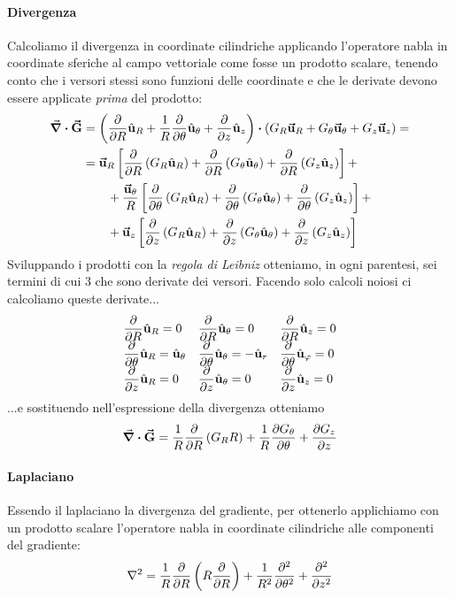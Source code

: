 \paragraph{Divergenza}
Calcoliamo il divergenza in coordinate cilindriche applicando l'operatore nabla in coordinate sferiche al campo vettoriale come fosse un prodotto scalare, tenendo conto che i versori stessi sono funzioni delle coordinate e che le derivate devono essere applicate \textit{prima} del prodotto:
\begin{align*}
	\div{\vba{G}}&=\left(\pdv{R}\vbh{u}_R+\frac{1}{R}\pdv{\theta}\vbh{u}_\theta+\pdv{z}\vbh{u}_z\right)\vdot\left(G_R\vba{u}_R+G_\theta\vba{u}_\theta+G_z\vba{u}_z\right)=\\
	&=\vba{u}_R\left[\pdv{R}\left(G_R\vbh{u}_R\right)+\pdv{R}\left(G_\theta\vbh{u}_\theta\right)+\pdv{R}\left(G_z\vbh{u}_{z}\right)\right]+\\
	&\qquad+\frac{\vba{u}_\theta}{R}\left[\pdv{\theta}\left(G_R\vbh{u}_R\right)+\pdv{\theta}\left(G_\theta\vbh{u}_\theta\right)+\pdv{\theta}\left(G_z\vbh{u}_{z}\right)\right]+\\
	&\qquad+\vba{u}_z\left[\pdv{z}\left(G_R\vbh{u}_R\right)+\pdv{z}\left(G_\theta\vbh{u}_\theta\right)+\pdv{z}\left(G_z\vbh{u}_{z}\right)\right]
\end{align*}
Sviluppando i prodotti con la \textit{regola di Leibniz} otteniamo, in ogni parentesi, sei termini di cui 3 che sono derivate dei versori. Facendo solo calcoli noiosi ci calcoliamo queste derivate...
\begin{equation*}
	\begin{array}{*3{>{\displaystyle}l}}
	\pdv{R}\vbh{u}_R=0&
	\pdv{R}\vbh{u}_\theta=0&
	\pdv{R}\vbh{u}_z=0\\
	\pdv{\theta}\vbh{u}_R=\vbh{u}_\theta&
	\pdv{\theta}\vbh{u}_\theta=-\vbh{u}_r&
	\pdv{\theta}\vbh{u}_\phi=0\\
	\pdv{z}\vbh{u}_R=0&
	\pdv{z}\vbh{u}_\theta=0&
	\pdv{z}\vbh{u}_z=0
	\end{array}
\end{equation*}
...e sostituendo nell'espressione della divergenza otteniamo
\begin{equation}
	\div{\vb*{\va{G}}}=\frac{1}{R}\pdv{R}\left(G_R R\right)+\frac{1}{R}\pdv{G_\theta}{\theta}+\pdv{G_z}{z}
\end{equation}
\paragraph{Laplaciano}
Essendo il laplaciano la divergenza del gradiente, per ottenerlo applichiamo con un prodotto scalare l'operatore nabla in coordinate cilindriche alle componenti del gradiente:
\begin{equation}
	\laplacian=\frac{1}{R}\pdv{R}\left(R\pdv{R}\right)+\frac{1}{R^2}\pdv[2]{\theta}+\pdv[2]{z}
\end{equation}
